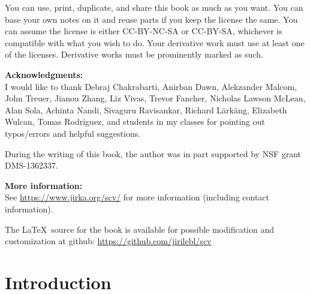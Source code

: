 \documentclass[12pt,openany]{book}
\theoremstyle{plain}
\theoremstyle{remark}
\theoremstyle{definition}
\theoremstyle{exercise}
\theoremstyle{example}
\begin{document}
\bigskip

\noindent
You can use, print, duplicate, and share this book as much as you want.  You can
base your own notes on it and reuse parts if you keep the license the
same.  You can assume the license is either CC-BY-NC-SA or CC-BY-SA\@,
whichever is compatible with what you wish to do.
Your derivative work must use at least one of the licenses.
Derivative works must be prominently marked as such.

\bigskip

\noindent
\textbf{Acknowledgments:}
\\
I would like to thank Debraj Chakrabarti, Anirban Dawn, Alekzander Malcom,
John Treuer, Jianou Zhang, Liz Vivas, Trevor Fancher,
Nicholas Lawson McLean, Alan Sola, Achinta Nandi,
Sivaguru Ravisankar, Richard L\"ark\"ang, Elizabeth Wulcan,
Tomas Rodriguez,
and students in my classes for pointing out typos/errors
and helpful suggestions.

\bigskip

\noindent
During the writing of this book,
the author was in part supported by NSF grant DMS-1362337.

\bigskip

\noindent
\textbf{More information:}
\\
See \url{https://www.jirka.org/scv/} for more information
(including contact information).

\medskip

\noindent
The \LaTeX\ source for the book is available
for possible modification and customization
at github: \url{https://github.com/jirilebl/scv}



\tableofcontents
{}



\chapter*{Introduction} \label{ch:intro}
\end{document}
